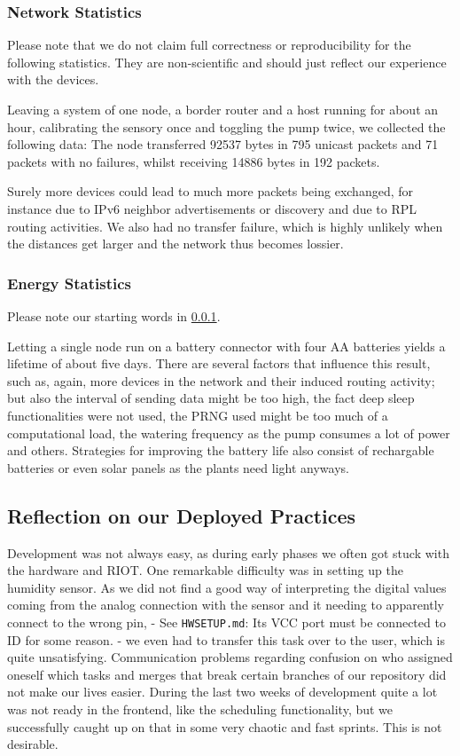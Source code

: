 \documentclass[acmtog, language=english, nonacm]{acmart}
\begin{document}
    \subsubsection{Network Statistics} \label{subsubsec:network_statistics}

    Please note that we do not claim full correctness or reproducibility for the following statistics. They are non-scientific and should just reflect our experience with the devices.

    Leaving a system of one node, a border router and a host running for about an hour, calibrating the sensory once and toggling the pump twice, we collected the following data: The node transferred 92537 bytes in 795 unicast packets and 71 packets with no failures, whilst receiving 14886 bytes in 192 packets.

    Surely more devices could lead to much more packets being exchanged, for instance due to IPv6 neighbor advertisements or discovery and due to RPL routing activities. We also had no transfer failure, which is highly unlikely when the distances get larger and the network thus becomes lossier.

    \subsubsection{Energy Statistics}

    Please note our starting words in \cref{subsubsec:network_statistics}.

    Letting a single node run on a battery connector with four AA batteries yields a lifetime of about five days. There are several factors that influence this result, such as, again, more devices in the network and their induced routing activity; but also the interval of sending data might be too high, the fact deep sleep functionalities were not used, the PRNG used might be too much of a computational load, the watering frequency as the pump consumes a lot of power and others. Strategies for improving the battery life also consist of rechargable batteries or even solar panels as the plants need light anyways.

    \subsection{Reflection on our Deployed Practices}

    Development was not always easy, as during early phases we often got stuck with the hardware and RIOT. One remarkable difficulty was in setting up the humidity sensor. As we did not find a good way of interpreting the digital values coming from the analog connection with the sensor and it needing to apparently connect to the wrong pin, - See \texttt{HWSETUP.md}: Its VCC port must be connected to ID for some reason. - we even had to transfer this task over to the user, which is quite unsatisfying. Communication problems regarding confusion on who assigned oneself which tasks and merges that break certain branches of our repository did not make our lives easier. During the last two weeks of development quite a lot was not ready in the frontend, like the scheduling functionality, but we successfully caught up on that in some very chaotic and fast sprints. This is not desirable.
\end{document}
